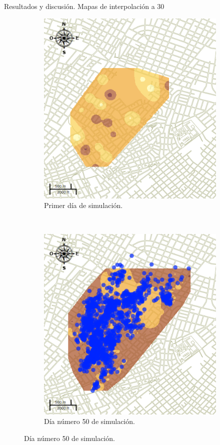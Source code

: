\begin{frame}[t]{Resultados y discusión. Mapas de interpolación a 30 \textcelsius}
    \begin{figure}
    \begin{subfigure}[b]{0.45\textwidth}
        \includegraphics[width=\textwidth]{./graphics/inicial.png}
        \caption{ Primer día de simulación.}
    \end{subfigure}
    ~~~~
    \begin{subfigure}[b]{0.45\textwidth}
        \includegraphics[width=\textwidth]{./graphics/temp-30-final.png}
        \caption{Día número 50 de simulación.}
    \end{subfigure}
    \end{figure}
\end{frame}


